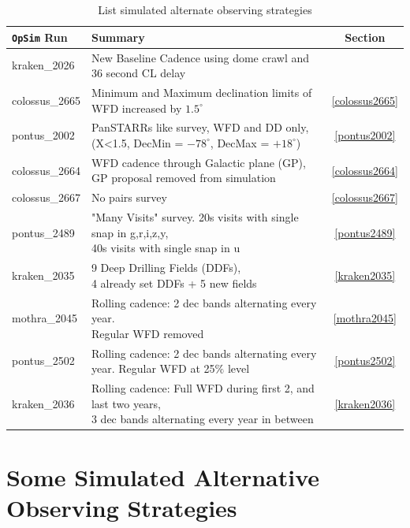 \documentclass[DM,lsstdraft,authoryear,toc]{lsstdoc}
\newcommand{\opsim}{\texttt{OpSim}\xspace}
\begin{document}
\begin{table}[htp]
\caption{List simulated alternate observing strategies}
\begin{center}
\footnotesize
\begin{tabular}{| l | l | c |}
\toprule
\opsim Run & Summary  & Section \\
\midrule
kraken\_2026      & New Baseline Cadence using dome crawl and 36 second CL delay & \\
\midrule
colossus\_2665   & Minimum and Maximum declination limits of WFD increased by $1.5^{\circ}$ & \ref{colossus2665} \\
\midrule
pontus\_2002      & PanSTARRs like survey, WFD and DD only, (X<1.5, DecMin = $-78^{\circ}$, DecMax = $+18^{\circ}$) & \ref{pontus2002}  \\  
\midrule
colossus\_2664   & WFD cadence through Galactic plane (GP), GP proposal removed from simulation & \ref{colossus2664} \\
\midrule
colossus\_2667   & No pairs survey &  \ref{colossus2667} \\
\midrule
pontus\_2489      & \makecell{"Many Visits" survey. 20s visits with single snap in g,r,i,z,y, \\ 40s visits with single snap in u}  &  \ref{pontus2489} \\
\midrule
kraken\_2035      &\makecell{ 9 Deep Drilling Fields (DDFs), \\ 4 already set DDFs + 5 new fields} &  \ref{kraken2035} \\
\midrule
mothra\_2045      & \makecell{Rolling cadence: 2 dec bands alternating every year. \\ Regular WFD removed} & \ref {mothra2045} \\
\midrule
pontus\_2502      &  \makecell{Rolling cadence: 2 dec bands alternating every year.  \\ Regular WFD at 25$\%$ level} & \ref {pontus2502} \\
\midrule
kraken\_2036      & \makecell{ Rolling cadence: Full WFD during first 2, and last two years, \\ 3 dec bands alternating every year in between} & \ref {kraken2036} \\
\bottomrule
\end{tabular}
\end{center}
\label{tab:runlist}
\end{table}

\section{Some Simulated Alternative Observing Strategies}
\end{document}
